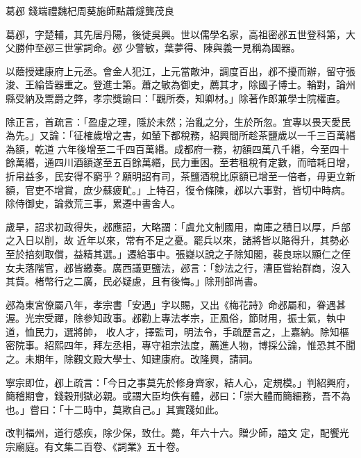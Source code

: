 
\begin{pinyinscope}

 葛邲
 錢端禮魏杞周葵施師點蕭燧龔茂良



 葛邲，字楚輔，其先居丹陽，後徙吳興。世以儒學名家，高祖密邲五世登科第，大父勝仲至邲三世掌詞命。邲
 少警敏，葉夢得、陳與義一見稱為國器。



 以蔭授建康府上元丞。會金人犯江，上元當敵沖，調度百出，邲不擾而辦，留守張浚、王綸皆器重之。登進士第。蕭之敏為御史，薦其才，除國子博士。輪對，論州縣受納及鬻爵之弊，孝宗獎諭曰：「觀所奏，知卿材。」除著作郎兼學士院權直。



 除正言，首疏言：「盈虛之理，隱於未然；治亂之分，生於所忽。宜專以畏天愛民為先。」又論：「征榷歲增之害，如輦下都稅務，紹興間所趁茶鹽歲以一千三百萬緡為額，乾道
 六年後增至二千四百萬緡。成都府一務，初額四萬八千緡，今至四十餘萬緡，通四川酒額遂至五百餘萬緡，民力重困。至若租稅有定數，而暗耗日增，折帛益多，民安得不窮乎？願明詔有司，茶鹽酒稅比原額已增至一倍者，毋更立新額，官吏不增賞，庶少蘇疲甿。」上特召，復令條陳，邲以六事對，皆切中時病。除侍御史，論救荒三事，累遷中書舍人。



 歲旱，詔求初政得失，邲應詔，大略謂：「虞允文制國用，南庫之積日以厚，戶部之入日以削，故
 近年以來，常有不足之憂。罷兵以來，諸將皆以賂得升，其勢必至於掊刻取償，益精其選。」遷給事中。張嶷以說之子除知閣，裴良琮以顯仁之侄女夫落階官，邲皆繳奏。廣西議更鹽法，邲言：「鈔法之行，漕臣嘗紿群商，沒入其貲。楮幣行之二廣，民必疑慮，且有後悔。」除刑部尚書。



 邲為東宮僚屬八年，孝宗書「安遇」字以賜，又出《梅花詩》命邲屬和，眷遇甚渥。光宗受禪，除參知政事。邲勸上專法孝宗，正風俗，節財用，振士氣，執中道，恤民力，選將帥，
 收人才，擇監司，明法令，手疏歷言之，上嘉納。除知樞密院事。紹熙四年，拜左丞相，專守祖宗法度，薦進人物，博採公論，惟恐其不聞之。未期年，除觀文殿大學士、知建康府。改隆興，請祠。



 寧宗即位，邲上疏言：「今日之事莫先於修身齊家，結人心，定規模。」判紹興府，簡稽期會，錢穀刑獄必親。或謂大臣均佚有體，邲曰：「崇大體而簡細務，吾不為也。」嘗曰：「十二時中，莫欺自己。」其實踐如此。



 改判福州，道行感疾，除少保，致仕。薨，年六十六。贈少師，謚文
 定，配饗光宗廟庭。有文集二百卷、《詞業》五十卷。




\end{pinyinscope}
